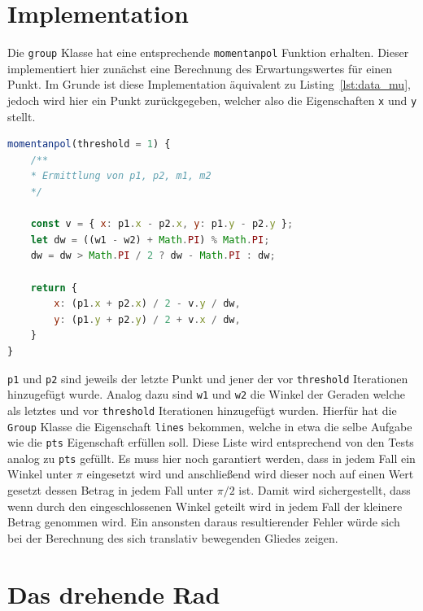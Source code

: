 \section{Implementation}

Die \lstinline{group} Klasse hat eine entsprechende \lstinline{momentanpol} Funktion erhalten.
Dieser implementiert hier zunächst eine Berechnung des Erwartungswertes für einen Punkt.
Im Grunde ist diese Implementation äquivalent zu Listing~\ref{lst:data_mu}, jedoch wird hier ein Punkt zurückgegeben, welcher also die Eigenschaften \lstinline{x} und \lstinline{y} stellt.

\begin{lstlisting}[language=JavaScript, caption={Definition der \lstinline{momentanpol} Funktion, welche in der \lstinline{group} Klasse definiert ist Die Ermittlung der Punkte \lstinline{p1} und \lstinline{p2}, sowie der Winkel \lstinline{w1} und \lstinline{w2} wurde hier aus Platzgründen weggelassen.}, label={lst:group_momentanpol}]
momentanpol(threshold = 1) {
    /**
    * Ermittlung von p1, p2, m1, m2
    */

    const v = { x: p1.x - p2.x, y: p1.y - p2.y };
    let dw = ((w1 - w2) + Math.PI) % Math.PI;
    dw = dw > Math.PI / 2 ? dw - Math.PI : dw;

    return {
        x: (p1.x + p2.x) / 2 - v.y / dw,
        y: (p1.y + p2.y) / 2 + v.x / dw,
    }
}
\end{lstlisting}

\lstinline{p1} und \lstinline{p2} sind jeweils der letzte Punkt und jener der vor \lstinline{threshold} Iterationen hinzugefügt wurde.
Analog dazu sind \lstinline{w1} und \lstinline{w2} die Winkel der Geraden welche als letztes und vor \lstinline{threshold} Iterationen hinzugefügt wurden.
Hierfür hat die \lstinline{Group} Klasse die Eigenschaft \lstinline{lines} bekommen, welche in etwa die selbe Aufgabe wie die \lstinline{pts} Eigenschaft erfüllen soll.
Diese Liste wird entsprechend von den Tests analog zu \lstinline{pts} gefüllt.
Es muss hier noch garantiert werden, dass in jedem Fall ein Winkel unter $\pi$ eingesetzt wird und anschlie{\ss}end wird dieser noch auf einen Wert gesetzt dessen Betrag in jedem Fall unter $\pi / 2$ ist. Damit wird sichergestellt, dass wenn durch den eingeschlossenen Winkel geteilt wird in jedem Fall der kleinere Betrag genommen wird.
Ein ansonsten daraus resultierender Fehler würde sich bei der Berechnung des sich translativ bewegenden Gliedes zeigen.

\section{Das drehende Rad}\label{ch:drehendesRad}

